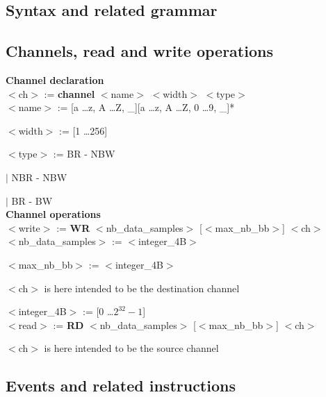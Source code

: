 \documentclass[12pt]{article}
\begin{document}
\newpage





\begin{onecolumn}



\section{Syntax and related grammar}

\subsection{Channels, read and write operations}

\textbf{Channel declaration}\\

\noindent $<$ch$>$ := \textbf{channel} $<$name$>$ $<$width$>$ $<$type$>$\\

$<$name$>$ := [a \ldots z, A \ldots Z, \_][a \ldots z, A \ldots Z, 0 \ldots 9, \_]* 

$<$width$>$ := [1 \ldots 256]

$<$type$>$ := \indent BR - NBW 

\indent \indent \indent \indent \indent $|$ NBR - NBW 

\indent \indent \indent \indent \indent $|$ BR - BW\\

\noindent \textbf{Channel operations}\\

\noindent $<$write$>$ := \textbf{WR} $<$nb\_data\_samples$>$ [$<$max\_nb\_bb$>$] $<$ch$>$\\

$<$nb\_data\_samples$>$ := $<$integer\_4B$>$  

$<$max\_nb\_bb$>$ := $<$integer\_4B$>$ 

$<$ch$>$ is here intended to be the destination channel 

\indent \indent $<$integer\_4B$>$ := [0 \ldots $2^{32}-1$] \\ 


\noindent $<$read$>$ := \textbf{RD} $<$nb\_data\_samples$>$ [$<$max\_nb\_bb$>$] $<$ch$>$

$<$ch$>$ is here intended to be the source channel


\subsection{Events and related instructions}


\end{onecolumn}
\end{document}
